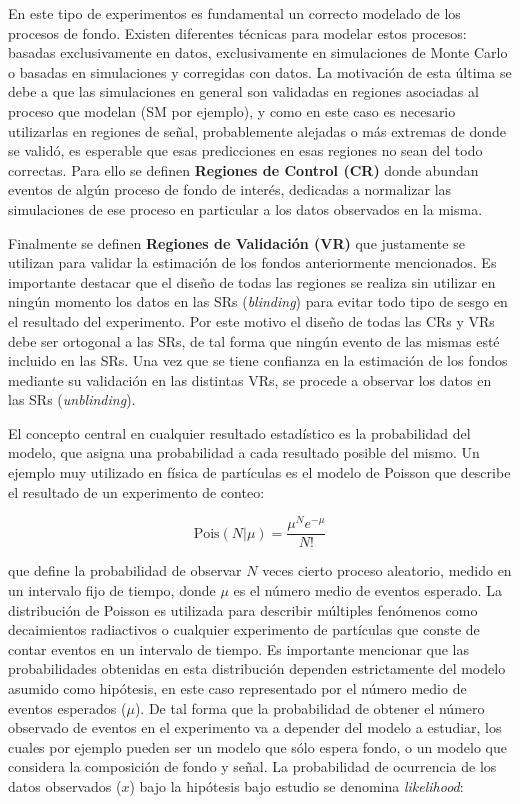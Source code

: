 En este tipo de experimentos es fundamental un correcto modelado de los procesos de fondo. Existen diferentes técnicas para modelar estos procesos: basadas exclusivamente en datos, exclusivamente en simulaciones de Monte Carlo o basadas en simulaciones y corregidas con datos. La motivación de esta última se debe a que las simulaciones en general son validadas en regiones asociadas al proceso que modelan (SM por ejemplo), y como en este caso es necesario utilizarlas en regiones de señal, probablemente alejadas o más extremas de donde se validó, es esperable que esas predicciones en esas regiones no sean del todo correctas. Para ello se definen \textbf{Regiones de Control (CR)} donde abundan eventos de algún proceso de fondo de interés, dedicadas a normalizar las simulaciones de ese proceso en particular a los datos observados en la misma.

Finalmente se definen \textbf{Regiones de Validación (VR)} que justamente se utilizan para validar la estimación de los fondos anteriormente mencionados. Es importante destacar que el diseño de todas las regiones se realiza sin utilizar en ningún momento los datos en las SRs (\textit{blinding}) para evitar todo tipo de sesgo en el resultado del experimento. Por este motivo el diseño de todas las CRs y VRs debe ser ortogonal a las SRs, de tal forma que ningún evento de las mismas esté incluido en las SRs. Una vez que se tiene confianza en la estimación de los fondos mediante su validación en las distintas VRs, se procede a observar los datos en las SRs (\textit{unblinding}).

El concepto central en cualquier resultado estadístico es la probabilidad del modelo, que asigna una probabilidad a cada resultado posible del mismo. Un ejemplo muy utilizado en física de partículas es el modelo de Poisson que describe el resultado de un experimento de conteo:

\begin{equation}
	\text{Pois}(N|\mu) = \frac{\mu^{N}e^{-\mu}}{N!}
\end{equation}

\noindent
que define la probabilidad de observar $N$ veces cierto proceso aleatorio, medido en un intervalo fijo de tiempo, donde $\mu$ es el número medio de eventos esperado. La distribución de Poisson es utilizada para describir múltiples fenómenos como decaimientos radiactivos o cualquier experimento de partículas que conste de contar eventos en un intervalo de tiempo. Es importante mencionar que las probabilidades obtenidas en esta distribución dependen estrictamente del modelo asumido como hipótesis, en este caso representado por el número medio de eventos esperados ($\mu$). De tal forma que la probabilidad de obtener el número observado de eventos en el experimento va a depender del modelo a estudiar, los cuales por ejemplo pueden ser un modelo que sólo espera fondo, o un modelo que considera la composición de fondo y señal. La probabilidad de ocurrencia de los datos observados ($x$) bajo la hipótesis bajo estudio se denomina \textit{likelihood}:

